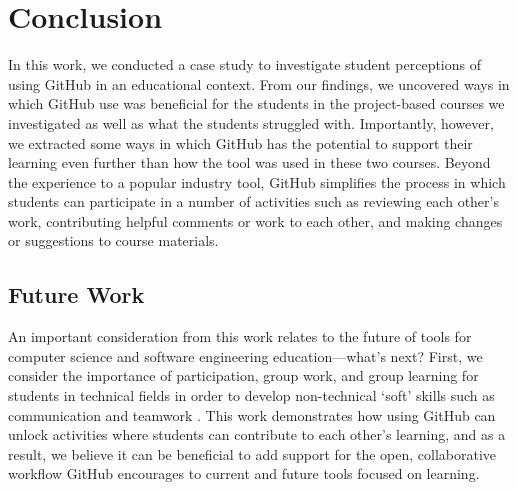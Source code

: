\section{Conclusion}



In this work, we conducted a case study to investigate student perceptions of using GitHub in an educational context. From our findings, we uncovered ways in which GitHub use was beneficial for the students in the project-based courses we investigated as well as what the students struggled with. Importantly, however, we extracted some ways in which GitHub has the potential to support their learning even further than how the tool was used in these two courses. Beyond the experience to a popular industry tool, GitHub simplifies the process in which students can participate in a number of activities such as reviewing each other's work, contributing helpful comments or work to each other, and making changes or suggestions to course materials.

\subsection{Future Work}
An important consideration from this work relates to the future of tools for computer science and software engineering education---what's next? First, we consider the importance of participation, group work, and group learning for students in technical fields in order to develop non-technical `soft' skills such as communication and teamwork \cite{jazayeri2004education}. This work demonstrates how using GitHub can unlock activities where students can contribute to each other's learning, and as a result, we believe it can be beneficial to add support for the open, collaborative workflow GitHub encourages to current and future tools focused on learning.


